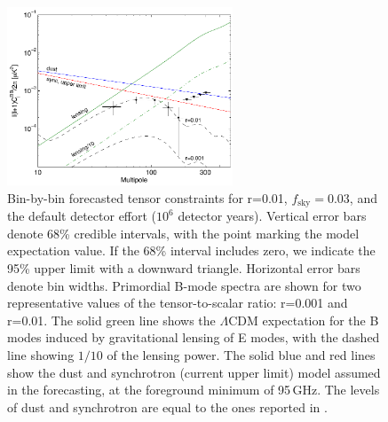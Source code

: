 \begin{figure}[h]
\centering
\includegraphics[width=0.6\textwidth]{Inflation/clBB_r01.pdf}
\caption{
Bin-by-bin forecasted tensor constraints for r=0.01, $f_\mathrm{sky} = 0.03$, 
and the default detector effort ($10^{6}$ detector years).
Vertical error bars denote 68\% credible intervals, with the point marking 
the model expectation value. If the 68\% interval includes zero, we indicate the 
95\% upper limit with a downward triangle. Horizontal error bars denote bin widths. 
Primordial B-mode spectra are shown for two representative values of the tensor-to-scalar ratio: r=0.001 and r=0.01.
The solid green line shows the
$\Lambda$CDM expectation for the B modes induced by gravitational lensing of E modes, 
with the dashed line showing $1/10$ of the lensing power. The
solid blue and red lines show the dust and synchrotron (current upper limit) model 
assumed in the forecasting, at the foreground minimum of 95\,GHz. The levels of dust
and synchrotron are equal to the ones reported in \cite{Array:2015xqh}.}
\label{fig_clBBr01}
\end{figure}

